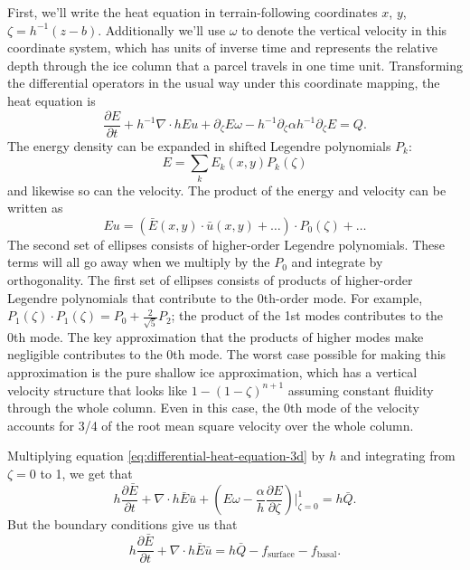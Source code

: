 \documentclass{article}
\theoremstyle{definition}
\theoremstyle{plain}
\begin{document}
First, we'll write the heat equation in terrain-following coordinates $x$, $y$, $\zeta = h^{-1}(z - b)$.
Additionally we'll use $\omega$ to denote the vertical velocity in this coordinate system, which has units of inverse time and represents the relative depth through the ice column that a parcel travels in one time unit.
Transforming the differential operators in the usual way under this coordinate mapping, the heat equation is
\begin{equation}
    \frac{\partial E}{\partial t} + h^{-1}\nabla\cdot hEu + \partial_\zeta E\omega - h^{-1}\partial_\zeta\alpha h^{-1}\partial_\zeta E = Q.
    \label{eq:differential-heat-equation-3d}
\end{equation}
The energy density can be expanded in shifted Legendre polynomials $P_k$:
\begin{equation}
    E = \sum_kE_k(x, y)P_k(\zeta)
\end{equation}
and likewise so can the velocity.
The product of the energy and velocity can be written as
\begin{equation}
    Eu = \left(\bar E(x, y)\cdot\bar u(x, y) + \ldots\right)\cdot P_0(\zeta) + \ldots
\end{equation}
The second set of ellipses consists of higher-order Legendre polynomials.
These terms will all go away when we multiply by the $P_0$ and integrate by orthogonality.
The first set of ellipses consists of products of higher-order Legendre polynomials that contribute to the 0th-order mode.
For example, $P_1(\zeta)\cdot P_1(\zeta) = P_0 + \frac{2}{\sqrt{5}}P_2$; the product of the 1st modes contributes to the 0th mode.
The key approximation that the products of higher modes make negligible contributes to the 0th mode.
The worst case possible for making this approximation is the pure shallow ice approximation, which has a vertical velocity structure that looks like $1 - (1 - \zeta)^{n + 1}$ assuming constant fluidity through the whole column.
Even in this case, the 0th mode of the velocity accounts for 3/4 of the root mean square velocity over the whole column.

Multiplying equation \eqref{eq:differential-heat-equation-3d} by $h$ and integrating from $\zeta = 0$ to 1, we get that
\begin{equation}
    h\frac{\partial\bar E}{\partial t} + \nabla\cdot h\bar E\bar u + \left(E\omega - \frac{\alpha}{h}\frac{\partial E}{\partial\zeta}\right)\Big|_{\zeta = 0}^1 = h\bar Q.
\end{equation}
But the boundary conditions give us that
\begin{equation}
    h\frac{\partial\bar E}{\partial t} + \nabla\cdot h\bar E\bar u = h\bar Q - f_{\text{surface}} - f_{\text{basal}}.
\end{equation}


\pagebreak



\end{document}
